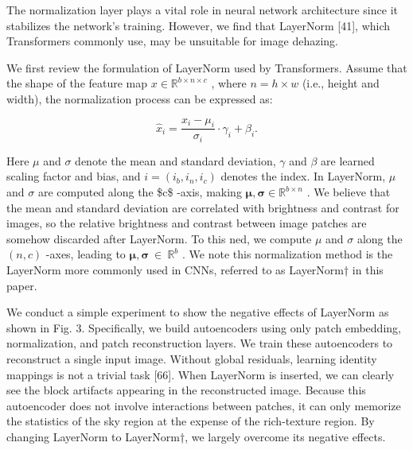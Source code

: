 The normalization layer plays a vital role in neural network architecture since it stabilizes the network’s training. However, we find that LayerNorm [41], which Transformers commonly use, may be unsuitable for image dehazing.

We first review the formulation of LayerNorm used by Transformers. Assume that the shape of the feature map $x\in\mathbb{R}^{b\times n\times c}$ , where $n=h\times w$ (i.e., height and width), the normalization process can be expressed as:

\begin{equation}
\hat{x}_{i}=\frac{x_{i}-\mu_{i}}{\sigma_{i}}\cdot\gamma_{i}+\beta_{i}.
\end{equation}

Here $\mu$ and $\sigma$ denote the mean and standard deviation, $\gamma$ and $\beta$ are learned scaling factor and bias, and $i=(i_{b},i_{n},i_{c})$ denotes the index. In LayerNorm, $\mu$ and $\sigma$ are computed along the \$c\$ -axis, making $\boldsymbol{\mu},\boldsymbol{\sigma}\in\mathbb{R}^{b\times n}$ . We believe that the mean and standard deviation are correlated with brightness and contrast for images, so the relative brightness and contrast between image patches are somehow discarded after LayerNorm. To this ned, we compute $\mu$ and $\sigma$ along the $(n,c)$ -axes, leading to $\boldsymbol{\mu},\boldsymbol{\sigma}~\in~\mathbb{R}^{b}$ . We note this normalization method is the LayerNorm more commonly used in CNNs, referred to as LayerNorm† in this paper.

We conduct a simple experiment to show the negative effects of LayerNorm as shown in Fig. 3. Specifically, we build autoencoders using only patch embedding, normalization, and patch reconstruction layers. We train these autoencoders to reconstruct a single input image. Without global residuals, learning identity mappings is not a trivial task [66]. When LayerNorm is inserted, we can clearly see the block artifacts appearing in the reconstructed image. Because this autoencoder does not involve interactions between patches, it can only memorize the statistics of the sky region at the expense of the rich-texture region. By changing LayerNorm to LayerNorm†, we largely overcome its negative effects.

